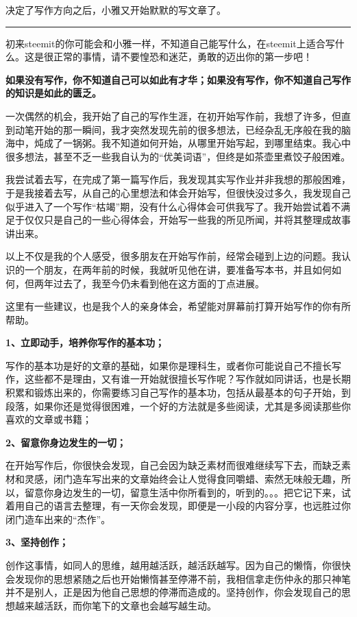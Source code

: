 \documentclass[]{ctexbook}
\begin{document}
决定了写作方向之后，小雅又开始默默的写文章了。

\begin{center}\rule{0.5\linewidth}{\linethickness}\end{center}

初来steemit的你可能会和小雅一样，不知道自己能写什么，在steemit上适合写什么。这是很正常的事情，请不要惶恐和迷茫，勇敢的迈出你的第一步吧！

\textbf{如果没有写作，你不知道自己可以如此有才华；如果没有写作，你不知道自己写作的知识是如此的匮乏。}

一次偶然的机会，我开始了自己的写作生涯，在初开始写作前，我想了许多，但直到动笔开始的那一瞬间，我才突然发现先前的很多想法，已经杂乱无序般在我的脑海中，炖成了一锅粥。我不知道如何开始，从哪里开始写起，到哪里结束。我心中很多想法，甚至不乏一些我自认为的``优美词语''，但终是如茶壶里煮饺子般困难。

我尝试着去写，在完成了第一篇写作后，我发现其实写作业并非我想的那般困难，于是我接着去写，从自己的心里想法和体会开始写，但很快没过多久，我发现自己似乎进入了一个写作``枯竭''期，没有什么心得体会可供我写了。我开始尝试着不满足于仅仅只是自己的一些心得体会，开始写一些我的所见所闻，并将其整理成故事讲出来。

以上不仅是我的个人感受，很多朋友在开始写作前，经常会碰到上边的问题。我认识的一个朋友，在两年前的时候，我就听见他在讲，要准备写本书，并且如何如何，但两年过去了，我至今仍未看到他在这方面的丁点进展。

这里有一些建议，也是我个人的亲身体会，希望能对屏幕前打算开始写作的你有所帮助。

\textbf{1、立即动手，培养你写作的基本功；}

写作的基本功是好的文章的基础，如果你是理科生，或者你可能说自己不擅长写作，这些都不是理由，又有谁一开始就很擅长写作呢？写作就如同讲话，也是长期积累和锻炼出来的，你需要练习自己写作的基本功，包括从最基本的句子开始，到段落，如果你还是觉得很困难，一个好的方法就是多些阅读，尤其是多阅读那些你喜欢的文章或书籍；

\textbf{2、留意你身边发生的一切；}

在开始写作后，你很快会发现，自己会因为缺乏素材而很难继续写下去，而缺乏素材和灵感，闭门造车写出来的文章始终会让人觉得食同嚼蜡、索然无味般无趣，所以，留意你身边发生的一切，留意生活中你所看到的，听到的。。。把它记下来，试着用自己的语言去整理，有一天你会发现，即便是一小段的内容分享，也远胜过你闭门造车出来的``杰作''。

\textbf{3、坚持创作；}

创作这事情，如同人的思维，越用越活跃，越活跃越写。因为自己的懒惰，你很快会发现你的思想紧随之后也开始懒惰甚至停滞不前，我相信拿走伤仲永的那只神笔并不是别人，正是因为他自己思想的停滞而造成的。坚持创作，你会发现自己的思想越来越活跃，而你笔下的文章也会越写越生动。
\end{document}
